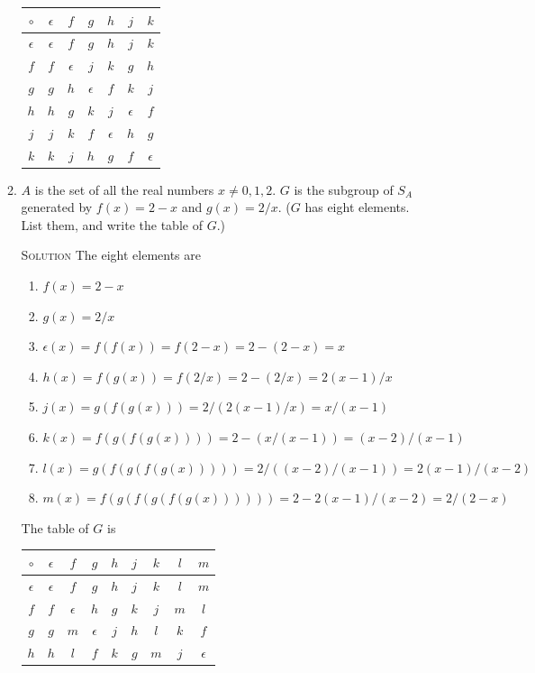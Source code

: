 \documentclass[twoside]{amsart}
\newcommand{\solution}{\textsc{Solution}\xspace}
\newcommand{\eps}{\ensuremath{\epsilon}\xspace}
\begin{document}
\begin{enumerate}[A.]
\begin{enumerate}[1]
      \begin{center}
      \begin{tabular}{c|cccccc}
         $\circ$ & $\epsilon$ & $f$ & $g$ & $h$ & $j$ & $k$ \\ \hline
	$\epsilon$& $\epsilon$& $f$ & $g$ & $h$ & $j$ & $k$ \\
	     $f$ & $f$ & $\epsilon$ & $j$ & $k$ & $g$ & $h$ \\
	     $g$ & $g$ & $h$ & $\epsilon$ & $f$ & $k$ & $j$ \\
	     $h$ & $h$ & $g$ & $k$ & $j$ & $\epsilon$ & $f$ \\
	     $j$ & $j$ & $k$ & $f$ & $\epsilon$ & $h$ & $g$ \\
	     $k$ & $k$ & $j$ & $h$ & $g$ & $f$ & $\epsilon$
      \end{tabular}
      \end{center}

      \item $A$ is the set of all the real numbers $x \ne 0,1,2$.
      $G$ is the subgroup of $S_A$ generated by $f(x)=2-x$ and 
      $g(x)=2/x$. ($G$ has eight elements. List them, and write
      the table of $G$.)

      \solution The eight elements are
      \begin{enumerate}[(1)]
         \item $f(x)=2-x$
	 \item $g(x)=2/x$ 
	 \item $\epsilon(x)=f(f(x))=f(2-x)=2-(2-x)=x$
	 \item $h(x)=f(g(x))=f(2/x)=2-(2/x)=2(x-1)/x$
	 \item $j(x)=g(f(g(x))) = 2/(2(x-1)/x) = x/(x-1)$
	 \item $k(x)=f(g(f(g(x)))) = 2 - (x/(x-1)) = (x-2)/(x-1)$
	 \item $l(x)=g(f(g(f(g(x))))) = 2/((x-2)/(x-1)) = 2(x-1)/(x-2)$
	 \item $m(x)=f(g(f(g(f(g(x)))))) = 2 - 2(x-1)/(x-2) = 2/(2-x)$
      \end{enumerate}

      The table of $G$ is
      \begin{center}
      \begin{tabular}{c|cccccccc}
         $\circ$ & \eps & $f$ & $g$ & $h$ & $j$ & $k$ & $l$ & $m$ \\ \hline
	  $\eps$ & \eps & $f$ & $g$ & $h$ & $j$ & $k$ & $l$ & $m$ \\
	     $f$ &  $f$ & \eps& $h$ & $g$ & $k$ & $j$ & $m$ & $l$ \\
	     $g$ &  $g$ & $m$ & \eps& $j$ & $h$ & $l$ & $k$ & $f$ \\
	     $h$ &  $h$ & $l$ & $f$ & $k$ & $g$ & $m$ & $j$ & \eps\\
      \end{tabular}
      \end{center}


\end{enumerate}
\end{enumerate}
\end{document}
